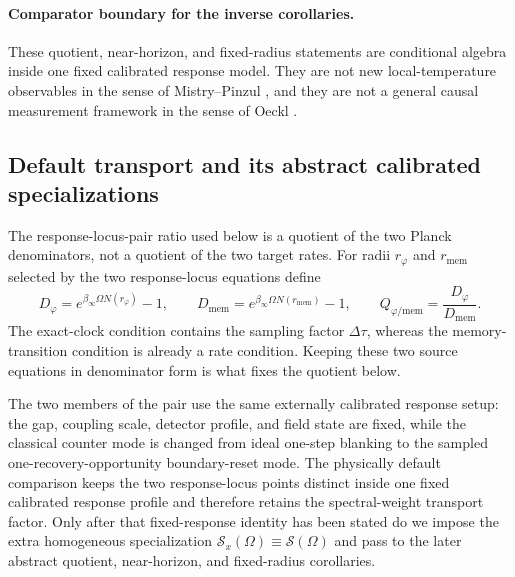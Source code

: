 \paragraph{Comparator boundary for the inverse corollaries.}
These quotient, near-horizon, and fixed-radius statements are conditional
algebra inside one fixed calibrated response model. They are not new
local-temperature observables in the sense of Mistry--Pinzul
\cite{MistryPinzul2024DiamondTemp}, and they are not a general causal
measurement framework in the sense of Oeckl
\cite{Oeckl2025CausalMeasurement}.

\subsection{Default transport and its abstract calibrated specializations}

The response-locus-pair ratio used below is a quotient of the two Planck
denominators, not a quotient of the two target rates. For radii
$r_\varphi$ and $r_{\mathrm{mem}}$ selected by the two response-locus
equations define
\begin{equation}\label{eq:denominator-convention-main}
D_\varphi=e^{\beta_\infty\Omega N(r_\varphi)}-1,\qquad
D_{\mathrm{mem}}=e^{\beta_\infty\Omega N(r_{\mathrm{mem}})}-1,\qquad
Q_{\varphi/\mathrm{mem}}=\frac{D_\varphi}{D_{\mathrm{mem}}}.
\end{equation}
The exact-clock condition contains the sampling factor $\Delta\tau$, whereas
the memory-transition condition is already a rate condition. Keeping these two
source equations in denominator form is what fixes the quotient below.

The two members of the pair use the same externally calibrated response setup:
the gap, coupling scale, detector profile, and field state are fixed, while the
classical counter mode is changed from ideal one-step blanking to the sampled
one-recovery-opportunity boundary-reset mode. The physically default comparison
keeps the two response-locus points distinct inside one fixed calibrated
response profile and therefore retains the spectral-weight transport factor.
Only after that fixed-response identity has been stated do we impose
the extra homogeneous specialization
$\mathcal S_x(\Omega)\equiv\mathcal S(\Omega)$ and pass to the later abstract
quotient, near-horizon, and fixed-radius corollaries.

\medskip
\noindent
{}%
\medskip

